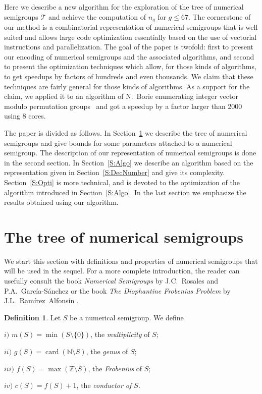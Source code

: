 \documentclass[reqno]{amsart}
\theoremstyle{plain}
\theoremstyle{definition}
\newtheorem{defi}[prop]{Definition}
\renewcommand{\leq}{\leqslant}
\newcommand{\NN}{\mathbb{N}}
\DeclareMathOperator{\card}{card}
\begin{document}
Here we describe a new algorithm for the exploration of the tree of numerical
semigroups $\mathcal{T}$ and achieve the computation of $n_g$ for $g\leq 67$.
The cornerstone of our method is a combinatorial representation of
numerical semigroups that is well suited and allows large code optimization essentially based on the use of
vectorial instructions and parallelization.
The goal of the paper is twofold:
first to present our encoding of numerical semigroups and the associated
algorithms, and second to present the optimization techniques which allow, for
those kinds of algorithms, to get speedups by factors of hundreds and even
thousands. We claim that these techniques are fairly general for those kinds of
algorithms. As a support for the claim, we applied it to an algorithm of
N.~Borie enumerating integer vector modulo permutation groups~\cite{Borie} and
got a speedup by a factor larger than 2000 using 8 cores.

The paper is divided as follows.
In Section~\ref{S:Tree} we describe the tree of numerical semigroups and give bounds for some parameters attached to a numerical semigroup.
The description of our representation of numerical semigroups is done in the second section.
In Section~\ref{S:Algo} we describe an algorithm based on the representation given in Section~\ref{S:DecNumber} and give its complexity. 
Section~\ref{S:Opti} is more technical, and is devoted to the optimization of the algorithm introduced in Section~\ref{S:Algo}.
In the last section we emphasize the results obtained using our algorithm.


\section{The tree of numerical semigroups}
\label{S:Tree}

We start this section with definitions and properties of numerical semigroups that will be used in the sequel.
For a more complete introduction, the reader can usefully consult the book \emph{Numerical Semigroups} by J.C.~Rosales and P.A.~Garc\'ia-S\'anchez \cite{BookNS} or the book \emph{The Diophantine Frobenius Problem} by J.L.~Ram\'irez~Alfons\'in \cite{BookDFP}.

\begin{defi}
Let $S$ be a numerical semigroup. We define 

$i)$ $m(S)=\min(S\setminus\{0\})$, the \emph{multiplicity} of $S$;

$ii)$ $g(S)=\card(\NN\setminus S)$, the \emph{genus} of $S$;

$iii)$ $f(S)=\max(\mathbb{Z}\setminus S)$, the \emph{Frobenius} of $S$;

$iv)$ $c(S)=f(S)+1$, the \emph{conductor of $S$}. 
\end{defi}
\end{document}

